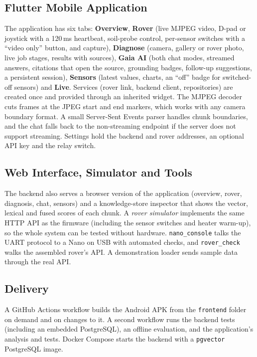 \subsection{Flutter Mobile Application}

The application has six tabs: \textbf{Overview}, \textbf{Rover} (live MJPEG video, D-pad or joystick with a 120\,ms heartbeat, soil-probe
control, per-sensor switches with a ``video only'' button, and capture), \textbf{Diagnose} (camera, gallery or rover photo, live job
stages, results with sources), \textbf{Gaia AI} (both chat modes, streamed answers, citations that open the source, grounding badges,
follow-up suggestions, a persistent session), \textbf{Sensors} (latest values, charts, an ``off'' badge for switched-off sensors) and
\textbf{Live}. Services (rover link, backend client, repositories) are created once and provided through an inherited widget.
The MJPEG decoder cuts frames at the JPEG start and end markers, which works with any camera boundary format. A small
Server-Sent Events parser handles chunk boundaries, and the chat falls back to the non-streaming endpoint if the server does not
support streaming. Settings hold the backend and rover addresses, an optional API key and the relay switch.

\subsection{Web Interface, Simulator and Tools}

The backend also serves a browser version of the application (overview, rover, diagnosis, chat, sensors) and a knowledge-store
inspector that shows the vector, lexical and fused scores of each chunk. A \emph{rover simulator} implements the same HTTP API as the firmware
(including the sensor switches and heater warm-up), so the whole system can be tested without hardware. \texttt{nano\_console} talks
the UART protocol to a Nano on USB with automated checks, and \texttt{rover\_check} walks the assembled rover's API. A demonstration
loader sends sample data through the real API.

\subsection{Delivery}

A GitHub Actions workflow builds the Android APK from the \texttt{frontend} folder on demand and on changes to it. A second workflow runs
the backend tests (including an embedded PostgreSQL), an offline evaluation, and the application's analysis and tests. Docker Compose starts
the backend with a \texttt{pgvector} PostgreSQL image.

